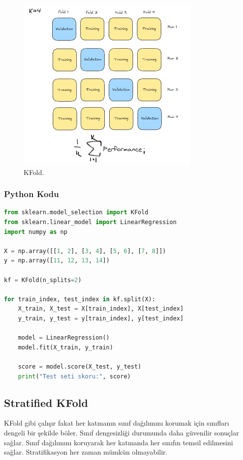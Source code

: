 \begin{figure}[h]
    \centering
    \includegraphics[width=0.8\textwidth]{images/kfold_structure.png}
    \caption{KFold.}
    \label{fig:enter-label}
\end{figure}

\subsubsection{Python Kodu}

\begin{lstlisting}[language=Python, caption=Scikit-learn'de KFold örneği.]
from sklearn.model_selection import KFold
from sklearn.linear_model import LinearRegression
import numpy as np

X = np.array([[1, 2], [3, 4], [5, 6], [7, 8]])
y = np.array([11, 12, 13, 14])

kf = KFold(n_splits=2)

for train_index, test_index in kf.split(X):
    X_train, X_test = X[train_index], X[test_index]
    y_train, y_test = y[train_index], y[test_index]
    
    model = LinearRegression()
    model.fit(X_train, y_train)
    
    score = model.score(X_test, y_test)
    print("Test seti skoru:", score)
\end{lstlisting}

\newpage

\subsection{Stratified KFold}
KFold gibi çalışır fakat her katmanın sınıf dağılımını korumak için sınıfları dengeli bir şekilde böler. Sınıf dengesizliği durumunda daha güvenilir sonuçlar sağlar. Sınıf dağılımını koruyarak her katmanda her sınıfın temsil edilmesini sağlar. Stratifikasyon her zaman mümkün olmayabilir.

